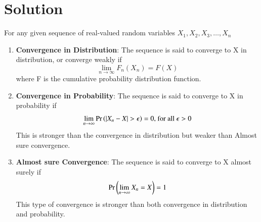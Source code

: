 \documentclass[journal,12pt,twocolumn]{IEEEtran}
\begin{document}
\section{\textbf{Solution}}
For any given sequence of real-valued random variables $X_1,X_2,X_3, \dots ,X_n$
\begin{enumerate}
    \item \textbf{Convergence in Distribution}: The sequence is said to converge to X in distribution, or converge weakly if
\begin{equation}
    \lim_{n \rightarrow \infty} F_n(X_n) = F(X)
\end{equation}
where F is the cumulative probability distribution function.\newline
\item \textbf{Convergence in Probability}: The sequence is said to converge to X in probability if \begin{align}
    \lim_{n \rightarrow \infty} \Pr\left(|X_n - X| > \epsilon\right) = 0 \text{, for all } \epsilon > 0
\end{align}
This is stronger than the convergence in distribution but weaker than Almost sure convergence.\newline
\item \textbf{Almost sure Convergence}: The sequence is said to converge to X almost surely if
\begin{align}
  \Pr\left(\lim_{n \rightarrow \infty} X_n = X\right) = 1  
\end{align}
This type of convergence is stronger than both convergence in distribution and probability.
\end{enumerate}
\end{document}
